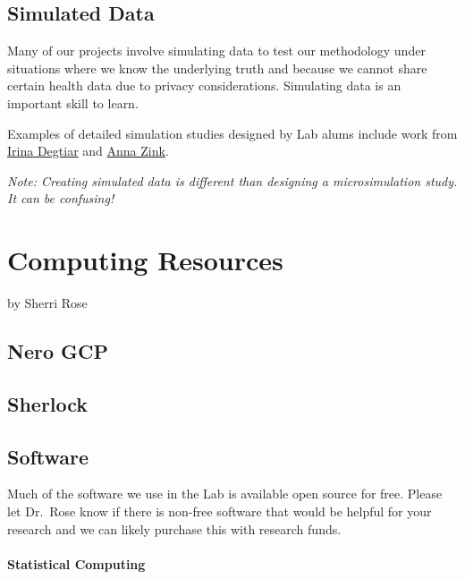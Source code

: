 \documentclass[
]{book}
\begin{document}
\hypertarget{simulated-data}{%
\section{Simulated Data}\label{simulated-data}}

Many of our projects involve simulating data to test our methodology under situations where we know the underlying truth and because we cannot share certain health data due to privacy considerations. Simulating data is an important skill to learn.

Examples of detailed simulation studies designed by Lab alums include work from \href{https://onlinelibrary.wiley.com/doi/10.1111/biom.13863}{Irina Degtiar} and \href{https://onlinelibrary.wiley.com/doi/10.1111/biom.13206}{Anna Zink}.

\emph{Note: Creating simulated data is different than designing a microsimulation study. It can be confusing!}

\hypertarget{computing-resources}{%
\chapter{Computing Resources}\label{computing-resources}}

by Sherri Rose

\hypertarget{nero-gcp}{%
\section{Nero GCP}\label{nero-gcp}}

\hypertarget{sherlock}{%
\section{Sherlock}\label{sherlock}}

\hypertarget{software}{%
\section{Software}\label{software}}

Much of the software we use in the Lab is available open source for free. Please let Dr.~Rose know if there is non-free software that would be helpful for your research and we can likely purchase this with research funds.

\hypertarget{statistical-computing}{%
\subsubsection*{Statistical Computing}\label{statistical-computing}}
\end{document}
